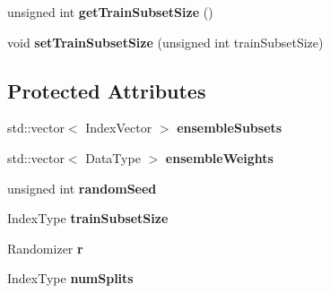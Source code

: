 \begin{DoxyCompactItemize}
\item 
\hypertarget{classffactory_1_1_extremely_randomized_trees_af12339b80870a7e8cc4426ac8934bc2c}{unsigned int {\bfseries get\-Train\-Subset\-Size} ()}\label{classffactory_1_1_extremely_randomized_trees_af12339b80870a7e8cc4426ac8934bc2c}

\item 
\hypertarget{classffactory_1_1_extremely_randomized_trees_a32c2edfb69796f2c8f319d0e3f734634}{void {\bfseries set\-Train\-Subset\-Size} (unsigned int train\-Subset\-Size)}\label{classffactory_1_1_extremely_randomized_trees_a32c2edfb69796f2c8f319d0e3f734634}

\end{DoxyCompactItemize}
\subsection*{Protected Attributes}
\begin{DoxyCompactItemize}
\item 
\hypertarget{classffactory_1_1_extremely_randomized_trees_a07fda462c8e1bf8bb3679e8e9c1f63bc}{std\-::vector$<$ Index\-Vector $>$ {\bfseries ensemble\-Subsets}}\label{classffactory_1_1_extremely_randomized_trees_a07fda462c8e1bf8bb3679e8e9c1f63bc}

\item 
\hypertarget{classffactory_1_1_extremely_randomized_trees_aea7faf187200de26e153bcd395530a94}{std\-::vector$<$ Data\-Type $>$ {\bfseries ensemble\-Weights}}\label{classffactory_1_1_extremely_randomized_trees_aea7faf187200de26e153bcd395530a94}

\item 
\hypertarget{classffactory_1_1_extremely_randomized_trees_ad308ec46d22a81888bcebad3bb29aea6}{unsigned int {\bfseries random\-Seed}}\label{classffactory_1_1_extremely_randomized_trees_ad308ec46d22a81888bcebad3bb29aea6}

\item 
\hypertarget{classffactory_1_1_extremely_randomized_trees_a5c70d036755477f1ea6694ab0af15b4c}{Index\-Type {\bfseries train\-Subset\-Size}}\label{classffactory_1_1_extremely_randomized_trees_a5c70d036755477f1ea6694ab0af15b4c}

\item 
\hypertarget{classffactory_1_1_extremely_randomized_trees_ab13b780504ea623b9ed02e3f86c9985d}{Randomizer {\bfseries r}}\label{classffactory_1_1_extremely_randomized_trees_ab13b780504ea623b9ed02e3f86c9985d}

\item 
\hypertarget{classffactory_1_1_extremely_randomized_trees_a956c4b7484bcd8646e2302a65e538623}{Index\-Type {\bfseries num\-Splits}}\label{classffactory_1_1_extremely_randomized_trees_a956c4b7484bcd8646e2302a65e538623}

\end{DoxyCompactItemize}


